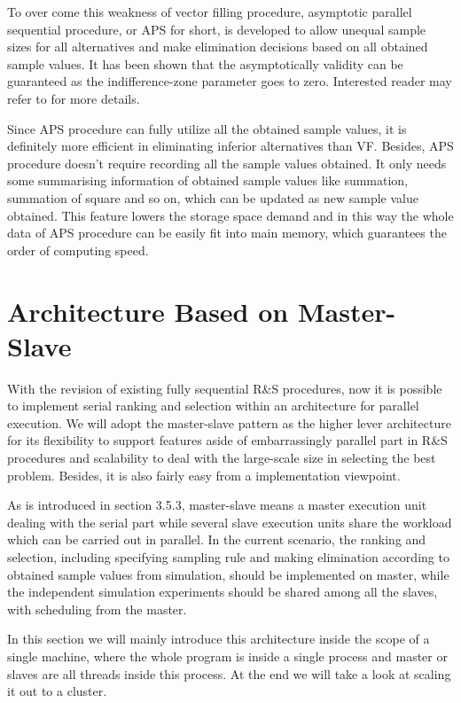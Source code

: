 \documentclass[12pt,a4paper]{report}
\begin{document}
To over come this weakness of vector filling procedure, asymptotic parallel sequential procedure, or APS for short, is developed to allow unequal sample sizes for all alternatives and make elimination decisions based on all obtained sample values. It has been shown that the asymptotically validity can be guaranteed as the indifference-zone parameter goes to zero. Interested reader may refer to \cite{ras-seq-parallel} for more details.

Since APS procedure can fully utilize all the obtained sample values, it is definitely more efficient in eliminating inferior alternatives than VF. Besides, APS procedure doesn't require recording all the sample values obtained. It only needs some summarising information of obtained sample values like summation, summation of square and so on, which can be updated as new sample value obtained. This feature lowers the storage space demand and in this way the whole data of APS procedure can be easily fit into main memory, which guarantees the order of computing speed.

\section{Architecture Based on Master-Slave}

With the revision of existing fully sequential R\&S procedures, now it is possible to implement serial ranking and selection within an architecture for parallel execution. We will adopt the master-slave pattern as the higher lever architecture for its flexibility to support features aside of embarrassingly parallel part in R\&S procedures and scalability to deal with the large-scale size in selecting the best problem. Besides, it is also fairly easy from a implementation viewpoint.

As is introduced in section 3.5.3, master-slave means a master execution unit dealing with the serial part while several slave execution units share the workload which can be carried out in parallel. In the current scenario, the ranking and selection, including specifying sampling rule and making elimination according to obtained sample values from simulation, should be implemented on master, while the independent simulation experiments should be shared among all the slaves, with scheduling from the master.

In this section we will mainly introduce this architecture inside the scope of a single machine, where the whole program is inside a single process and master or slaves are all threads inside this process. At the end we will take a look at scaling it out to a cluster.
\end{document}
